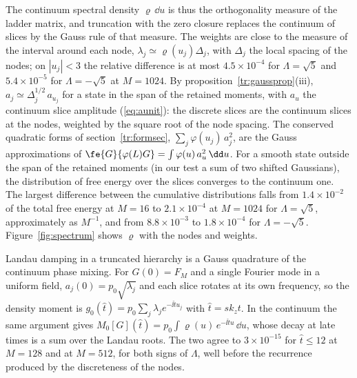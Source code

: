 The continuum spectral density $\varrho\,\dd u$ is thus the orthogonality measure of the ladder matrix, and truncation with the zero closure replaces the continuum of slices by the Gauss rule of that measure. The weights are close to the measure of the interval around each node, $\lambda_j\simeq\varrho(u_j)\Delta_j$, with $\Delta_j$ the local spacing of the nodes; on $|u_j|<3$ the relative difference is at most $4.5\times10^{-4}$ for $\Lambda=\sqrt5$ and $5.4\times10^{-5}$ for $\Lambda=-\sqrt5$ at $M=1024$. By proposition~\ref{tr:gaussprop}(iii), $a_j\simeq\Delta_j^{1/2}\,a_{u_j}$ for a state in the span of the retained moments, with $a_u$ the continuum slice amplitude (\ref{eq:aunit}): the discrete slices are the continuum slices at the nodes, weighted by the square root of the node spacing. The conserved quadratic forms of section~\ref{tr:formsec}, $\sum_j\varphi(u_j)\,a_j^2$, are the Gauss approximations of $\fe{G}{\varphi(L)G}=\int\varphi(u)\,a_u^2\,\dd u$. For a smooth state outside the span of the retained moments (in our test a sum of two shifted Gaussians), the distribution of free energy over the slices converges to the continuum one. The largest difference between the cumulative distributions falls from $1.4\times10^{-2}$ of the total free energy at $M=16$ to $2.1\times10^{-4}$ at $M=1024$ for $\Lambda=\sqrt5$, approximately as $M^{-1}$, and from $8.8\times10^{-3}$ to $1.8\times10^{-4}$ for $\Lambda=-\sqrt5$. Figure~\ref{fig:spectrum} shows $\varrho$ with the nodes and weights.

Landau damping in a truncated hierarchy is a Gauss quadrature of the continuum phase mixing. For $G(0)=F_M$ and a single Fourier mode in a uniform field, $a_j(0)=p_0\sqrt{\lambda_j}$ and each slice rotates at its own frequency, so the density moment is $g_0(\hat t)=p_0\sum_j\lambda_je^{-\ii\hat t u_j}$ with $\hat t=sk_zt$. In the continuum the same argument gives $M_0[G](\hat t)=p_0\int\varrho(u)\,e^{-\ii\hat t u}\,\dd u$, whose decay at late times is a sum over the Landau roots. The two agree to $3\times10^{-15}$ for $\hat t\le12$ at $M=128$ and at $M=512$, for both signs of $\Lambda$, well before the recurrence produced by the discreteness of the nodes.

